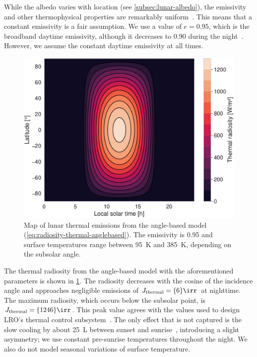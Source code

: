While the albedo varies with location (see \cref{subsec:lunar-albedo}), the emissivity and other thermophysical properties are remarkably uniform~\cite{Hayne2017}. This means that a constant emissivity is a fair assumption. We use a value of $e = 0.95$, which is the broadband daytime emissivity, although it decreases to 0.90 during the night~\cite{Bandfield2015}. However, we assume the constant daytime emissivity at all times.

\begin{figure}[t]
    \centering
    \includegraphics[width=\linewidth]{figures/plots/thermal_map.pdf}
    \caption{Map of lunar thermal emissions from the angle-based model (\cref{eq:radiosity-thermal-anglebased}). The emissivity is 0.95 and surface temperatures range between \qty{95}{\K} and \qty{385}{\K}, depending on the subsolar angle.}
    \label{fig:thermal-map}
\end{figure}

The thermal radiosity from the angle-based model with the aforementioned parameters is shown in \cref{fig:thermal-map}. The radiosity decreases with the cosine of the incidence angle and approaches negligible emissions of $J_\text{thermal} = \qty{6}{\irr}$ at nighttime. The maximum radiosity, which occurs below the subsolar point, is $J_\text{thermal} = \qty{1246}{\irr}$. This peak value agrees with the values used to design \gls{LRO}'s thermal control subsystem~\cite{Tooley2010}. The only effect that is not captured is the slow cooling by about \qty{25}{\L} between sunset and sunrise~\cite{Vasavada2012}, introducing a slight asymmetry; we use constant pre-sunrise temperatures throughout the night. We also do not model seasonal variations of surface temperature.






